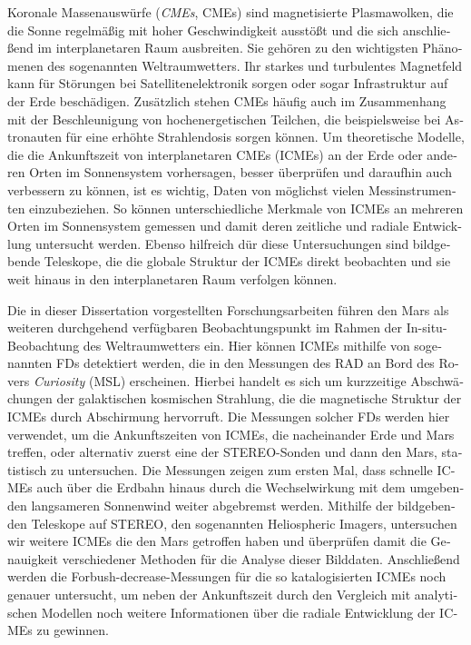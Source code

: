 \begin{otherlanguage}{ngerman}
Koronale Massenauswürfe (\textit{\aclp{CME}}, \acp{CME}) sind magnetisierte Plasmawolken, die die Sonne regelmäßig mit hoher Geschwindigkeit ausstößt und die sich anschließend im interplanetaren Raum ausbreiten. Sie gehören zu den wichtigsten Phänomenen des sogenannten Weltraumwetters.
Ihr starkes und turbulentes Magnetfeld kann für Störungen bei Satellitenelektronik sorgen oder sogar Infrastruktur auf der Erde beschädigen. Zusätzlich stehen \acp{CME} häufig auch im Zusammenhang mit der Beschleunigung von hochenergetischen Teilchen, die beispielsweise bei Astronauten für eine erhöhte Strahlendosis sorgen können.
Um theoretische Modelle, die die Ankunftszeit von interplanetaren \acp{CME} (\acsp{ICME}) an der Erde oder anderen Orten im Sonnensystem vorhersagen, besser überprüfen und daraufhin auch verbessern zu können, ist es wichtig, Daten von möglichst vielen Messinstrumenten einzubeziehen. So können unterschiedliche Merkmale von \acp{ICME} an mehreren Orten im Sonnensystem gemessen und damit deren zeitliche und radiale Entwicklung untersucht werden. Ebenso hilfreich dür diese Untersuchungen sind bildgebende Teleskope, die die globale Struktur der \acp{ICME} direkt beobachten und sie weit hinaus in den interplanetaren Raum verfolgen können.

Die in dieser Dissertation vorgestellten Forschungsarbeiten führen den Mars als weiteren durchgehend verfügbaren Beobachtungspunkt im Rahmen der In-situ-Beobachtung des Weltraumwetters ein. Hier können \acp{ICME} mithilfe von sogenannten \aclp{FD} detektiert werden, die in den Messungen des \ac{RAD} an Bord des Rovers \textit{Curiosity} (\acl{MSL}) erscheinen. Hierbei handelt es sich um kurzzeitige Abschwächungen der galaktischen kosmischen Strahlung, die die magnetische Struktur der \acp{ICME} durch Abschirmung hervorruft.
Die Messungen solcher \aclp{FD} werden hier verwendet, um die Ankunftszeiten von \acp{ICME}, die nacheinander Erde und Mars treffen, oder alternativ zuerst eine der \acs{STEREO}-Sonden und dann den Mars, statistisch zu untersuchen. %
Die Messungen zeigen zum ersten Mal, dass schnelle \acp{ICME} auch über die Erdbahn hinaus durch die Wechselwirkung mit dem umgebenden langsameren Sonnenwind weiter abgebremst werden.
Mithilfe der bildgebenden Teleskope auf \acs{STEREO}, den sogenannten Heliospheric Imagers, untersuchen wir weitere \acp{ICME} die den Mars getroffen haben und überprüfen damit die Genauigkeit verschiedener Methoden für die Analyse dieser Bilddaten.
Anschließend werden die Forbush-decrease-Messungen für die so katalogisierten \acp{ICME} noch genauer untersucht, um neben der Ankunftszeit durch den Vergleich mit analytischen Modellen noch weitere Informationen über die radiale Entwicklung der \acp{ICME} zu gewinnen.


\end{otherlanguage}
